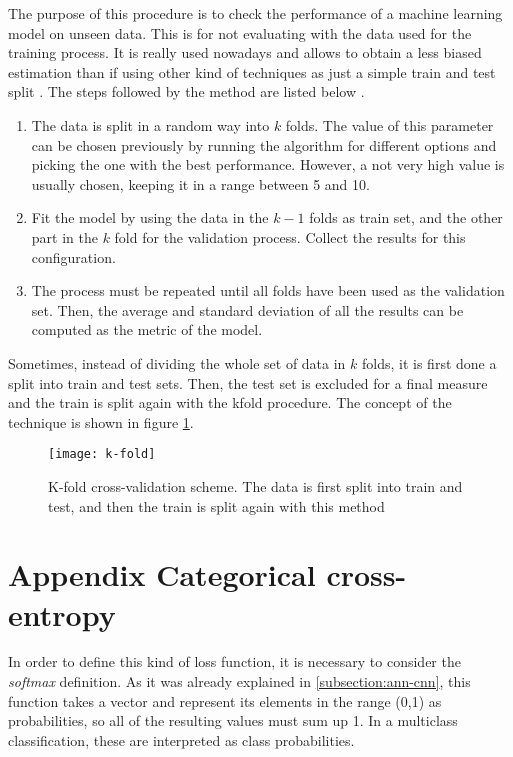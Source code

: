 	The purpose of this procedure is to check the performance of a machine learning model on unseen data. This is for not evaluating with the data used for the training process. It is really used nowadays and allows to obtain a less biased estimation than if using other kind of techniques as just a simple train and test split \cite{Browniee2018}. The steps followed by the method are listed below \cite{M2018}.
	
	\begin{enumerate}
		\item The data is split in a random way into $k$ folds. The value of this parameter can be chosen previously by running the algorithm for different options and picking the one with the best performance. However, a not very high value is usually chosen, keeping it in a range between 5 and 10.
		\item Fit the model by using the data in the $k - 1$ folds as train set, and the other part in the $k$ fold for the validation process. Collect the results for this configuration.
		\item The process must be repeated until all folds have been used as the validation set. Then, the average and standard deviation of all the results can be computed as the metric of the model. 
	\end{enumerate}

	Sometimes, instead of dividing the whole set of data in $k$ folds, it is first done a split into train and test sets. Then, the test set is excluded for a final measure and the train is split again with the \acrlong{kfold} procedure. The concept of the technique is shown in figure \ref{fig:mesh16}.
	
	\begin{figure}[H]
		\centering
		\captionsetup{justification=centering}
		\texttt{[image: k-fold]}
		\caption{K-fold cross-validation scheme. The data is first split into train and test, and then the train is split again with this method \cite{Scikit-learna}}
		\label{fig:mesh16}
	\end{figure}

\chapter{Appendix Categorical cross-entropy}
\label{appendix:categorical-cross-entropy}

	In order to define this kind of loss function, it is necessary to consider the \textit{softmax} definition. As it was already explained in \ref{subsection:ann-cnn}, this function takes a vector and represent its elements in the range (0,1) as probabilities, so all of the resulting values must sum up 1. In a multiclass classification, these are interpreted as class probabilities.
	
